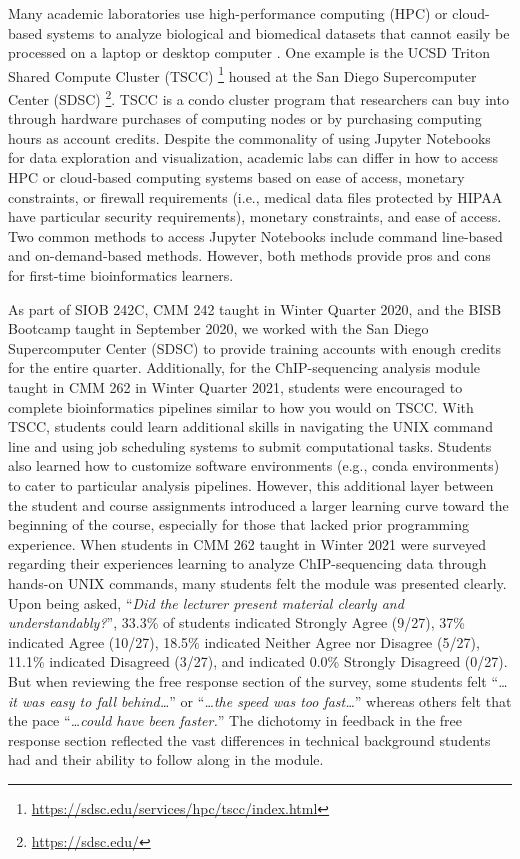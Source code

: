 Many academic laboratories use high-performance computing (HPC) or cloud-based systems to analyze biological and biomedical datasets that cannot easily be processed on a laptop or desktop computer \cite{pal2020,marx2013,stephens2015,leonelli2019}. One example is the UCSD Triton Shared Compute Cluster (TSCC) \footnote{\href{https://sdsc.edu/services/hpc/tscc/index.html}{https://sdsc.edu/services/hpc/tscc/index.html}} housed at the San Diego Supercomputer Center (SDSC) \footnote{\href{https://sdsc.edu/}{https://sdsc.edu/}}. TSCC is a condo cluster program that researchers can buy into through hardware purchases of computing nodes or by purchasing computing hours as account credits. Despite the commonality of using Jupyter Notebooks for data exploration and visualization, academic labs can differ in how to access HPC or cloud-based computing systems based on ease of access, monetary constraints, or firewall requirements (i.e., medical data files protected by HIPAA have particular security requirements), monetary constraints, and ease of access. Two common methods to access Jupyter Notebooks include command line-based and on-demand-based methods. However, both methods provide pros and cons for first-time bioinformatics learners. 

As part of SIOB 242C, CMM 242 taught in Winter Quarter 2020, and the BISB Bootcamp taught in September 2020, we worked with the San Diego Supercomputer Center (SDSC) to provide training accounts with enough credits for the entire quarter. Additionally, for the ChIP-sequencing analysis module taught in CMM 262 in Winter Quarter 2021, students were encouraged to complete bioinformatics pipelines similar to how you would on TSCC. With TSCC, students could learn additional skills in navigating the UNIX command line and using job scheduling systems to submit computational tasks. Students also learned how to customize software environments (e.g., conda environments) to cater to particular analysis pipelines. However, this additional layer between the student and course assignments introduced a larger learning curve toward the beginning of the course, especially for those that lacked prior programming experience. When students in CMM 262 taught in Winter 2021 were surveyed regarding their experiences learning to analyze ChIP-sequencing data through hands-on UNIX commands, many students felt the module was presented clearly. Upon being asked, “\textit{Did the lecturer present material clearly and understandably?}”, 33.3\% of students indicated Strongly Agree (9/27), 37\% indicated Agree (10/27), 18.5\% indicated Neither Agree nor Disagree (5/27), 11.1\% indicated Disagreed (3/27), and indicated 0.0\% Strongly Disagreed (0/27). But when reviewing the free response section of the survey, some students felt “\textit{…it was easy to fall behind…}” or “\textit{…the speed was too fast…}” whereas others felt that the pace “\textit{…could have been faster.}” The dichotomy in feedback in the free response section reflected the vast differences in technical background students had and their ability to follow along in the module. 

